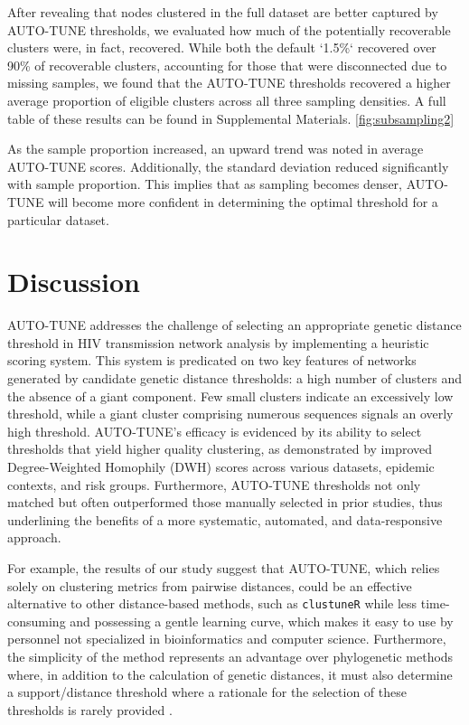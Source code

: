 \documentclass[utf8]{FrontiersinHarvard} %
\newcommand{\TODO}[1]{{\color{red}{#1}}}
\begin{document}
After revealing that nodes clustered in the full dataset are better captured by
AUTO-TUNE thresholds, we evaluated how much of the potentially recoverable
clusters were, in fact, recovered. While both the default `1.5\%` recovered
over 90\% of recoverable clusters, accounting for those that were disconnected
due to missing samples, we found that the AUTO-TUNE thresholds recovered a
higher average proportion of eligible clusters across all three sampling
densities. A full table of these results can be found in Supplemental
Materials. \ref{fig:subsampling2}

As the sample proportion increased, an upward trend was noted in average
AUTO-TUNE scores. Additionally, the standard deviation reduced significantly
with sample proportion. This implies that as sampling becomes denser, AUTO-TUNE
will become more confident in determining the optimal threshold for a
particular dataset.

\section{Discussion}

\TODO{NEEDS REVIEW}


AUTO-TUNE addresses the challenge of selecting an appropriate genetic distance
threshold in HIV transmission network analysis by implementing a heuristic
scoring system. This system is predicated on two key features of networks
generated by candidate genetic distance thresholds: a high number of clusters
and the absence of a giant component. Few small clusters indicate an
excessively low threshold, while a giant cluster comprising numerous sequences
signals an overly high threshold. AUTO-TUNE's efficacy is evidenced by its
ability to select thresholds that yield higher quality clustering, as
demonstrated by improved Degree-Weighted Homophily (DWH) scores across various
datasets, epidemic contexts, and risk groups. Furthermore, AUTO-TUNE thresholds
not only matched but often outperformed those manually selected in prior
studies, thus underlining the benefits of a more systematic, automated, and
data-responsive approach.

For example, the results of our study suggest that AUTO-TUNE, which relies
solely on clustering metrics from pairwise distances, could be an effective
alternative to other distance-based methods, such as {\tt clustuneR} while less
time-consuming and possessing a gentle learning curve, which makes it easy to
use by personnel not specialized in bioinformatics and computer science.
Furthermore, the simplicity of the method represents an advantage over
phylogenetic methods where, in addition to the calculation of genetic
distances, it must also determine a support/distance threshold where a
rationale for the selection of these thresholds is rarely provided
\citep{junqueira_factors_2019}.
\end{document}
